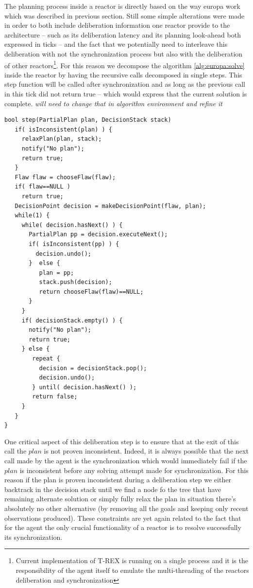 The planning process inside a reactor is directly based on the way
europa work which was described in previous section. Still some simple
alterations were made in  order to both include deliberation
information one reactor provide to the architecture -- such as its
deliberation latency and its planning look-ahead both expressed in 
ticks -- and the fact that we potentially need to interleave this
deliberation with not the synchronization process but also with 
the deliberation of other reactors\footnote{Current implementation of
  T-REX is running on a single process and it is the responsibility of
  the agent itself to emulate the multi-threading of the reactors
  deliberation and synchronization}. For this reason we 
decompose the algorithm \ref{alg:europa:solve} inside the reactor by
having the recursive calls decomposed in single steps. This step
function will be called after synchronization and as long as the
previous call in this tick did not return \textsf{true} -- which would
express that the current solution is complete.
{\em will need to change that in algorithm environment and refine it}

\begin{verbatim}
bool step(PartialPlan plan, DecisionStack stack) 
   if( isInconsistent(plan) ) {
     relaxPlan(plan, stack);
     notify("No plan");
     return true;
   } 
   Flaw flaw = chooseFlaw(flaw);
   if( flaw==NULL )
     return true;
   DecisionPoint decision = makeDecisionPoint(flaw, plan);
   while(1) {
     while( decision.hasNext() ) {
       PartialPlan pp = decision.executeNext();
       if( isInconsistent(pp) ) {
         decision.undo();
       }  else {
          plan = pp;
          stack.push(decision);
          return chooseFlaw(flaw)==NULL;
       }
     }
     if( decisionStack.empty() ) {
       notify("No plan");
       return true;
     } else {
        repeat {
          decision = decisionStack.pop();
          decision.undo();
        } until( decision.hasNext() );
        return false;
     }
   } 
}
\end{verbatim}

One critical aspect of this deliberation step is to ensure that at the
exit of this call the $plan$ is not proven inconsistent. Indeed, it is
always possible that the next call made by the agent is the
synchronization which would immediately fail if the $plan$ is
inconsistent before any solving attempt made for synchronization. 
For this reason if the plan is proven inconsistent during a
deliberation step we either backtrack in the decision stack until we
find a node fo the tree that have remaining alternate solution or
simply fully relax the plan in situation there's absolutely no other
alternative  (by removing all the goals and keeping
only recent observations produced). These constraints are yet again
related to the fact that for the agent the only crucial functionality
of a reactor is to resolve successfully its synchronization. 

